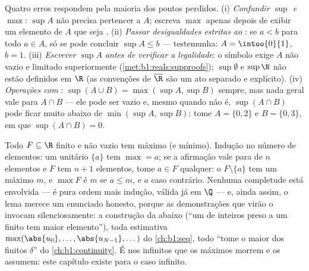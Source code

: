 \begin{remark}
Quatro erros respondem pela maioria dos pontos perdidos. (i) \emph{Confundir
$\sup$ e $\max$}: $\sup A$ não precisa pertencer a $A$; escreva $\max$
apenas depois de exibir um elemento de $A$ que seja .
(ii) \emph{Passar desigualdades estritas ao }: se $a <
b$ para todo $a \in A$, só se pode concluir $\sup A \leq b$ ---
testemunha: $A = \intoo{0}{1}$, $b = 1$. (iii) \emph{Escrever $\sup A$
antes de verificar a legalidade}: o símbolo exige $A$ não vazio e
limitado superiormente (\cref{met:b1:reals:supproofs}); $\sup \emptyset$
e $\sup \N$ não estão definidos em $\R$ (as convenções de
$\overline\R$ são um ato separado e explícito). (iv) \emph{Operações
com }: $\sup(A \cup B) = \max(\sup A, \sup B)$ sempre, mas
nada geral vale para $A \cap B$ --- ele pode ser vazio e, mesmo quando
não é, $\sup(A \cap B)$ pode ficar muito abaixo de
$\min(\sup A, \sup B)$: tome $A = \{0, 2\}$ e $B = \{0, 3\}$,
em que $\sup(A \cap B) = 0$.
\end{remark}

\begin{example}\label{ex:b1:reals:finitemax}
Todo $F \subseteq \R$ finito e não vazio tem máximo (e
mínimo). Indução no número de elementos: um  unitário
$\{a\}$ tem $\max = a$; se a afirmação vale para  de $n$
elementos e $F$ tem $n + 1$ elementos, tome $a \in F$ qualquer: o
 $F
\setminus \{a\}$ tem um máximo $m$, e $\max F$ é $m$ se $a
\leq m$, e $a$ caso contrário. Nenhuma completude está envolvida --- é
pura ordem mais indução, válida já em $\Q$ --- e, ainda assim, o lema
merece um enunciado honesto, porque as demonstrações que virão o
invocam silenciosamente: a construção da  abaixo (``um
 de inteiros preso a um  finito tem maior elemento''),
toda estimativa $\max(\abs{u_0}, \dots, \abs{u_{N-1}}, \dots)$ do
\cref{ch:b1:seq}, todo ``tome o maior dos finitos $\delta$'' do
\cref{ch:b1:continuity}. É nos  infinitos que os
máximos morrem e os  assumem: este capítulo existe para o caso
infinito.
\end{example}

